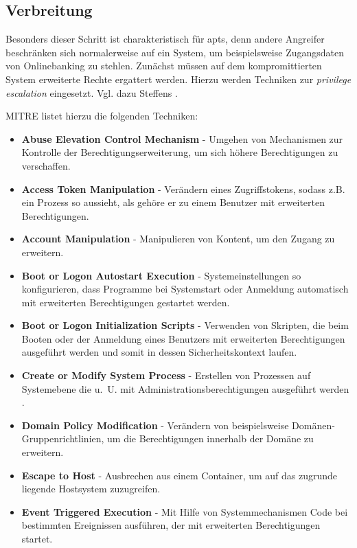 \documentclass[conference]{IEEEtran}
\begin{document}
\subsection{Verbreitung}

Besonders dieser Schritt ist charakteristisch für \acp{apt}, denn andere Angreifer beschränken sich normalerweise auf ein System, um beispielsweise Zugangsdaten von Onlinebanking zu stehlen.
Zunächst müssen auf dem kompromittierten System erweiterte Rechte ergattert werden.
Hierzu werden Techniken zur \textit{privilege escalation} eingesetzt.
Vgl. dazu Steffens \cite[S.~16f]{Steffens2020}.

MITRE \cite{MITREPrivilegeEscalation} listet hierzu die folgenden Techniken:
\begin{itemize}
    \item \textbf{Abuse Elevation Control Mechanism} - Umgehen von Mechanismen zur Kontrolle der Berechtigungserweiterung, um sich höhere Berechtigungen zu verschaffen.
    \item \textbf{Access Token Manipulation} - Verändern eines Zugriffstokens, sodass z.B.~ ein Prozess so aussieht, als gehöre er zu einem Benutzer mit erweiterten Berechtigungen.
    \item \textbf{Account Manipulation} - Manipulieren von Kontent, um den Zugang zu erweitern.
    \item \textbf{Boot or Logon Autostart Execution} - Systemeinstellungen so konfigurieren, dass Programme bei Systemstart oder Anmeldung automatisch mit erweiterten Berechtigungen gestartet werden.
    \item \textbf{Boot or Logon Initialization Scripts} - Verwenden von Skripten, die beim Booten oder der Anmeldung eines Benutzers mit erweiterten Berechtigungen ausgeführt werden und somit in dessen Sicherheitskontext laufen.
    \item \textbf{Create or Modify System Process} - Erstellen von Prozessen auf Systemebene die u.~U. mit Administrationsberechtigungen ausgeführt werden \cite{MITRECreateOrModifySystemProcess}.
    \item \textbf{Domain Policy Modification} - Verändern von beispielsweise Domänen-Gruppenrichtlinien, um die Berechtigungen innerhalb der Domäne zu erweitern.
    \item \textbf{Escape to Host} - Ausbrechen aus einem Container, um auf das zugrunde liegende Hostsystem zuzugreifen.
    \item \textbf{Event Triggered Execution} - Mit Hilfe von Systemmechanismen Code bei bestimmten Ereignissen ausführen, der mit erweiterten Berechtigungen startet.

\end{itemize}
\end{document}
